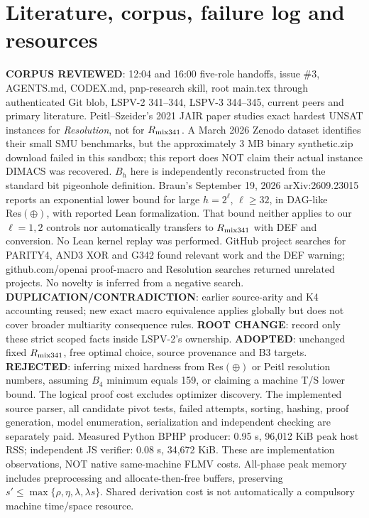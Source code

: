 \documentclass[11pt]{article}
\begin{document}
\section{Literature, corpus, failure log and resources}
\noindent\textbf{CORPUS REVIEWED}: 12:04 and 16:00 five-role handoffs, issue \#3, AGENTS.md, CODEX.md, pnp-research skill, root main.tex through authenticated Git blob, LSPV-2 341--344, LSPV-3 344--345, current peers and primary literature. Peitl--Szeider's 2021 JAIR paper studies exact hardest UNSAT instances for \emph{Resolution}, not for $R_{\rm mix341}$. A March 2026 Zenodo dataset identifies their small SMU benchmarks, but the approximately 3 MB binary synthetic.zip download failed in this sandbox; this report does NOT claim their actual instance DIMACS was recovered. $B_h$ here is independently reconstructed from the standard bit pigeonhole definition. Braun's September 19, 2026 arXiv:2609.23015 reports an exponential lower bound for large $h=2^\ell$, $\ell\ge32$, in DAG-like $\mathrm{Res}(\oplus)$, with reported Lean formalization. That bound neither applies to our $\ell=1,2$ controls nor automatically transfers to $R_{\rm mix341}$ with DEF and conversion. No Lean kernel replay was performed.
GitHub project searches for PARITY4, AND3 XOR and G342 found relevant work and the DEF warning; github.com/openai proof-macro and Resolution searches returned unrelated projects. No novelty is inferred from a negative search. \textbf{DUPLICATION/CONTRADICTION}: earlier source-arity and K4 accounting reused; new exact macro equivalence applies globally but does not cover broader multiarity consequence rules. \textbf{ROOT CHANGE}: record only these strict scoped facts inside LSPV-2's ownership. \textbf{ADOPTED}: unchanged fixed $R_{\rm mix341}$, free optimal choice, source provenance and B3 targets. \textbf{REJECTED}: inferring mixed hardness from Res$(\oplus)$ or Peitl resolution numbers, assuming $B_4$ minimum equals 159, or claiming a machine T/S lower bound.
The logical proof cost excludes optimizer discovery. The implemented source parser, all candidate pivot tests, failed attempts, sorting, hashing, proof generation, model enumeration, serialization and independent checking are separately paid. Measured Python BPHP producer: 0.95 s, 96,012 KiB peak host RSS; independent JS verifier: 0.08 s, 34,672 KiB. These are implementation observations, NOT native same-machine FLMV costs. All-phase peak memory includes preprocessing and allocate-then-free buffers, preserving $s'\le\max\{\rho,\eta,\lambda,\lambda s\}$. Shared derivation cost is not automatically a compulsory machine time/space resource.
\end{document}
